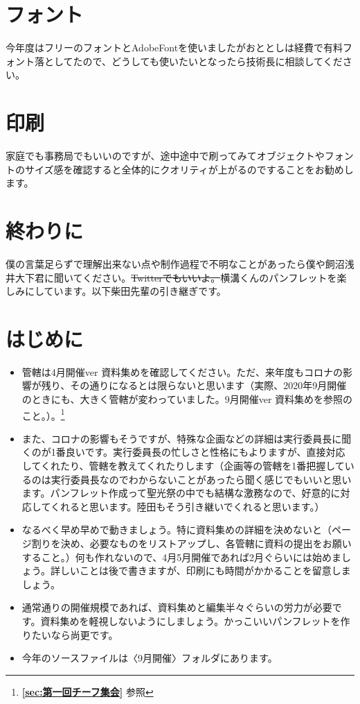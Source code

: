 \documentclass[dvipdfmx,jb5]{jreport}
\begin{document}
\section{フォント}
今年度はフリーのフォントとAdobeFontを使いましたがおととしは経費で有料フォント落としてたので、どうしても使いたいとなったら技術長に相談してください。

\section{印刷}
家庭でも事務局でもいいのですが、途中途中で刷ってみてオブジェクトやフォントのサイズ感を確認すると全体的にクオリティが上がるのですることをお勧めします。

\section{終わりに}
僕の言葉足らずで理解出来ない点や制作過程で不明なことがあったら僕や飼沼浅井大下君に聞いてください。\sout{Twitterでもいいよ。}横溝くんのパンフレットを楽しみにしています。以下柴田先輩の引き継ぎです。

\section{はじめに}
\begin{itemize}
      \item 管轄は4月開催ver 資料集めを確認してください。ただ、来年度もコロナの影響が残り、その通りになるとは限らないと思います（実際、2020年9月開催のときにも、大きく管轄が変わっていました。9月開催ver 資料集めを参照のこと。）。\footnote{{\bf \ref{sec:第一回チーフ集会}} 参照}
      \item また、コロナの影響もそうですが、特殊な企画などの詳細は実行委員長に聞くのが1番良いです。実行委員長の忙しさと性格にもよりますが、直接対応してくれたり、管轄を教えてくれたりします（企画等の管轄を1番把握しているのは実行委員長なのでわからないことがあったら聞く感じでもいいと思います。パンフレット作成って聖光祭の中でも結構な激務なので、好意的に対応してくれると思います。陸田もそう引き継いでくれると思います。）
      \item なるべく早め早めで動きましょう。特に資料集めの詳細を決めないと（ページ割りを決め、必要なものをリストアップし、各管轄に資料の提出をお願いすること。）何も作れないので、4月5月開催であれば2月ぐらいには始めましょう。詳しいことは後で書きますが、印刷にも時間がかかることを留意しましょう。
      \item 通常通りの開催規模であれば、資料集めと編集半々ぐらいの労力が必要です。資料集めを軽視しないようにしましょう。かっこいいパンフレットを作りたいなら尚更です。
      \item 今年のソースファイルは〈9月開催〉フォルダにあります。
\end{itemize}
\end{document}
